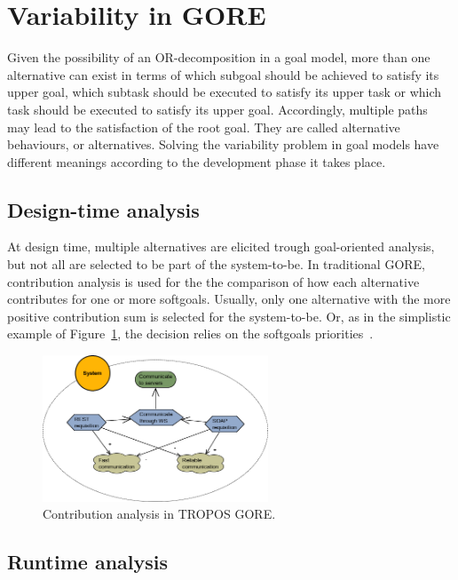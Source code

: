 \section{Variability in GORE}\label{sec:variability}

Given the possibility of an OR-decomposition in a goal model, more than one alternative can exist in terms of which subgoal should be achieved to satisfy its upper goal,  which subtask should be executed to satisfy its upper task or which task should be executed to satisfy its upper goal. Accordingly, multiple paths may lead to the satisfaction of the root goal. They are called alternative behaviours, or alternatives. Solving the variability problem in goal models have different meanings according to the development phase it takes place. 

\subsection{Design-time analysis}

At design time, multiple alternatives are elicited trough goal-oriented analysis, but not all are selected to be part of the system-to-be. In traditional GORE, contribution analysis is used for the the comparison of how each alternative contributes for one or more softgoals. Usually, only one alternative with the more positive contribution sum is selected for the system-to-be. Or, as in the simplistic example of Figure~\ref{fig:GORE_CA}, the decision relies on the softgoals priorities~\cite{Yu:2013}.

\begin{figure}[h!]
\centering
\includegraphics[width=0.6\textwidth]{imgs/GORE_CA.png}
\caption{Contribution analysis in TROPOS GORE.}
\label{fig:GORE_CA}
\end{figure}

\subsection{Runtime analysis}

